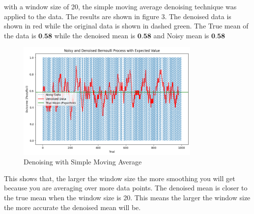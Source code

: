 \documentclass[a4paper,12pt]{article} %
\begin{document}
with a window size of 20, the simple moving average denoising technique was applied to the data. The results are shown in figure 3. The denoised data is shown in red while the original data is shown in dashed green. The True mean of the data is \(\textbf{0.58}\) while the denoised mean is \(\textbf{0.58}\) and Noisy mean is \(\textbf{0.58}\)
\begin{figure}[h]
\centering
\includegraphics[width=0.8\textwidth]{window_20.png}
\caption{Denoising with Simple Moving Average}
\end{figure}

This shows that, the larger the window size the more smoothing you will get because you are averaging over more data points. The denoised mean is closer to the true mean when the window size is 20. This means the larger the window size the more accurate the denoised mean will be.
\end{document}
